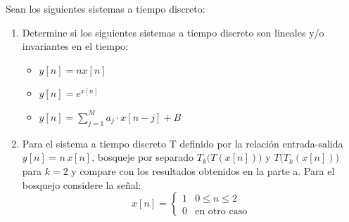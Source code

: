 \documentclass[
  11pt,
  letterpaper,
   addpoints,
   answers
  ]{exam}
\begin{document}
\begin{questions}
\question Sean los siguientes sistemas a tiempo discreto:

\begin{enumerate}
\item Determine si los siguientes sistemas a tiempo discreto son lineales y/o invariantes en el tiempo:
\begin{itemize}
\item $y[n] = nx[n]$
\item $y[n] = e^{x[n]}$
\item $y[n] = \sum_{j=1}^{M} a_j \cdot x[n-j] + B$
\end{itemize}

\item Para el sistema a tiempo discreto T definido por la relación entrada-salida $y[n] = n\,x[n]$, bosqueje por separado $T_k\big(T(x[n])\big)$ y $T\big(T_k(x[n])\big)$ para $k = 2$ y compare con los resultados obtenidos en la parte a. Para el bosquejo considere la señal:
\begin{equation}
x[n] = \begin{cases}
1 & 0 \leq n \leq 2 \\
0 & \text{en otro caso}
\end{cases}
\end{equation}
\end{enumerate}
\begin{solution}

\end{solution}
\end{questions}
\end{document}
